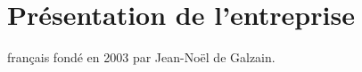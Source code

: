 \documentclass[a4paper, 11pt, french]{report}
\begin{document}
                                                                                                                                                                                                                        \chapter{Présentation
                                                                                                                                                                                                                        de
                                                                                                                                                                                                                        l'entreprise}
                                                                                                                                                                                                                         français
                                                                                                                                                                                                                         fondé
                                                                                                                                                                                                                         en
                                                                                                                                                                                                                         2003
                                                                                                                                                                                                                         par
                                                                                                                                                                                                                         Jean-Noël
                                                                                                                                                                                                                         de
                                                                                                                                                                                                                         Galzain.
\end{document}
